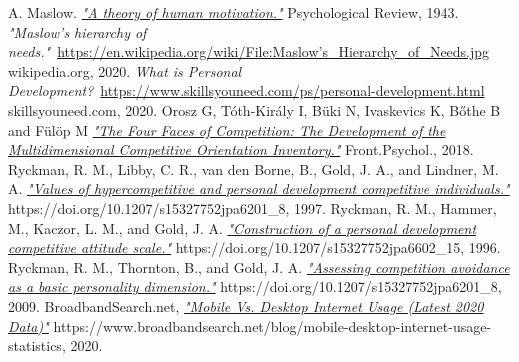 \documentclass[twoside]{ctuthesis}
\begin{document}
    \maketitle
    
    
    
    
    
    
    
    

    
    \begin{thebibliography}{99}
         A. Maslow. \href{http://psychclassics.yorku.ca/Maslow/motivation.htm}{\emph{"A theory of human motivation."}} Psychological Review, 1943.
         \emph{"Maslow's hierarchy of needs."}~\href{https://en.wikipedia.org/wiki/File:Maslow's_Hierarchy_of_Needs.jpg}{https://en.wikipedia.org/wiki/File:Maslow's\_Hierarchy\_of\_Needs.jpg} wikipedia.org, 2020.
         \emph{What is Personal Development?}~\href{https://www.skillsyouneed.com/ps/personal-development.html}{https://www.skillsyouneed.com/ps/personal-development.html} skillsyouneed.com, 2020.
         Orosz G, Tóth-Király I, Büki N, Ivaskevics K, Bőthe B and Fülöp M \href{https://www.frontiersin.org/articles/10.3389/fpsyg.2018.00779/full}{\emph{"The Four Faces of Competition: The Development of the Multidimensional Competitive Orientation Inventory."}} Front.Psychol., 2018.
         Ryckman, R. M., Libby, C. R., van den Borne, B., Gold, J. A., and Lindner, M. A. \href{https://doi.org/10.1207/s15327752jpa6201_8}{\emph{"Values of hypercompetitive and personal development competitive individuals."}} https://doi.org/10.1207/s15327752jpa6201\_8, 1997.
         Ryckman, R. M., Hammer, M., Kaczor, L. M., and Gold, J. A. \href{https://doi.org/10.1207/s15327752jpa6602_15}{\emph{"Construction of a personal development competitive attitude scale."}} https://doi.org/10.1207/s15327752jpa6602\_15, 1996.
         Ryckman, R. M., Thornton, B., and Gold, J. A. \href{https://doi.org/10.1207/s15327752jpa6201_8}{\emph{"Assessing competition avoidance as a basic personality dimension."}} https://doi.org/10.1207/s15327752jpa6201\_8, 2009.
         BroadbandSearch.net, \href{https://www.broadbandsearch.net/blog/mobile-desktop-internet-usage-statistics}{\emph{"Mobile Vs. Desktop Internet Usage (Latest 2020 Data)"}} https://www.broadbandsearch.net/blog/mobile-desktop-internet-usage-statistics, 2020.
    \end{thebibliography}
\end{document}
